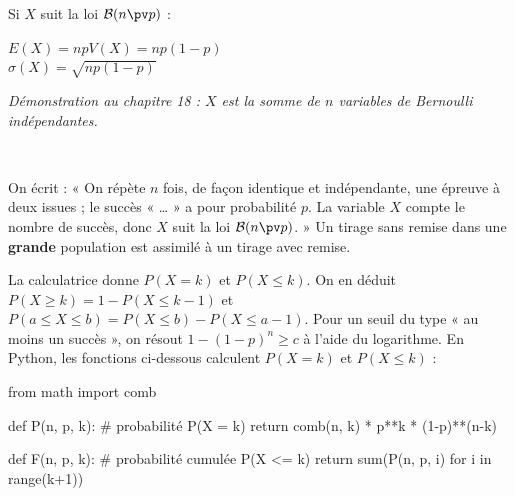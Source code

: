 \noindent
\begin{minipage}[c]{0.46\linewidth}
\begin{theoreme}
\raggedright
Si $X$ suit la loi $\mathcal{B}(n\pv p)$ :\\[1.5mm]
{\centering $E(X)=np$\qquad $V(X)=np(1-p)$\\[1mm] $\sigma(X)=\sqrt{np(1-p)}$\par}\vspace{1.5mm}
\emph{Démonstration au chapitre 18 : $X$ est la somme de $n$ variables de Bernoulli indépendantes.}
\end{theoreme}
\end{minipage}\hfill
\begin{minipage}[c]{0.5\linewidth}
\centering
{}\\[0.5mm]
\end{minipage}


\begin{savoirfaire}
On écrit : « On répète $n$ fois, de façon identique et indépendante, une épreuve à deux issues ; le succès « … » a pour
probabilité $p$. La variable $X$ compte le nombre de succès, donc $X$ suit la loi $\mathcal{B}(n\pv p)$. » Un tirage sans remise
dans une \textbf{grande} population est assimilé à un tirage avec remise.
\end{savoirfaire}

\begin{savoirfaire}
La calculatrice donne $P(X=k)$ et $P(X\leq k)$. On en déduit $P(X\geq k)=1-P(X\leq k-1)$ et
$P(a\leq X\leq b)=P(X\leq b)-P(X\leq a-1)$. Pour un seuil du type « au moins un succès », on résout $1-(1-p)^{n}\geq c$ à l'aide du
logarithme. En Python, les fonctions ci-dessous calculent $P(X=k)$ et $P(X\leq k)$ :
\end{savoirfaire}
\begin{python}
from math import comb

def P(n, p, k):     # probabilité P(X = k)
    return comb(n, k) * p**k * (1-p)**(n-k)

def F(n, p, k):     # probabilité cumulée P(X <= k)
    return sum(P(n, p, i) for i in range(k+1))
\end{python}

